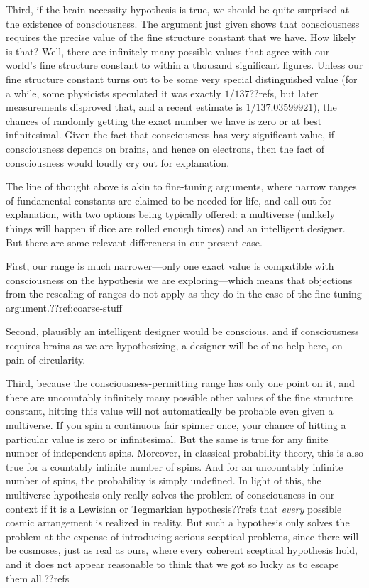 Third, if the brain-necessity hypothesis is true, we should be quite surprised at the existence
of consciousness. The argument just given shows that consciousness requires the precise value of
the fine structure constant that we have. How likely is that? Well, there are infinitely
many possible values that agree with our world's fine structure constant to within a thousand
significant figures. Unless our fine structure constant turns out to be some very special distinguished
value (for a while, some physicists speculated it was exactly $1/137$??refs, but later measurements 
disproved that, and a recent estimate is $1/137.03599921$), the chances of randomly getting the exact number
we have is zero or at best infinitesimal. Given the fact that consciousness has very significant value, 
if consciousness depends on brains, and hence on electrons, then
the fact of consciousness would loudly cry out for explanation. 

The line of thought above is akin to fine-tuning arguments, where narrow ranges of fundamental constants
are claimed to be needed for life, and call out for explanation, with two options being typically offered:
a multiverse (unlikely things will happen if dice are rolled enough times) and an intelligent designer. But there are
some relevant differences in our present case. 

First, our range is much narrower---only one exact
value is compatible with consciousness on the hypothesis we are exploring---which means that objections from
the rescaling of ranges do not apply as they do in the case of the fine-tuning argument.??ref:coarse-stuff 

Second, plausibly an intelligent designer
would be conscious, and if consciousness requires brains as we are hypothesizing, a designer will be of no help
here, on pain of circularity. 

Third, because the consciousness-permitting range has only one point on it, 
and there are uncountably infinitely many possible other values of the fine structure constant, hitting this value
will not automatically be probable even given a multiverse. If you spin a continuous fair spinner once, 
your chance of hitting a particular value is zero or infinitesimal. But the same is true for any finite number of independent spins.
Moreover, in classical probability theory, this is also true for a countably infinite number of spins. And for an
uncountably infinite number of spins, the probability is simply undefined. In light of this, the multiverse hypothesis only
really solves the problem of consciousness in our context if it is a Lewisian or Tegmarkian hypothesis??refs that \textit{every} 
possible cosmic arrangement is realized in reality. But such a hypothesis only solves the problem at the expense of introducing serious
sceptical problems, since there will be cosmoses, just as real as ours, where every coherent sceptical hypothesis hold, and it does
not appear reasonable to think that we got so lucky as to escape them all.??refs

